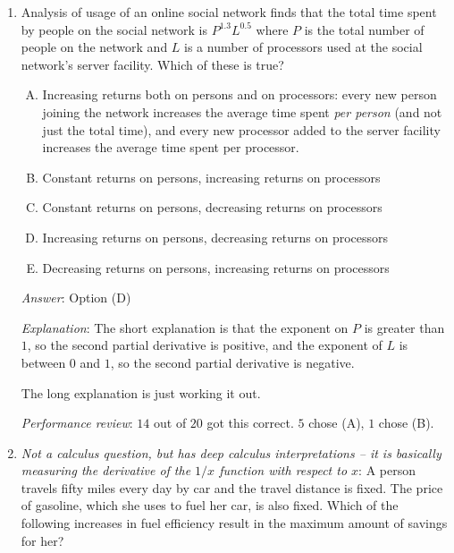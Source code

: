 \documentclass[10pt]{amsart}
\begin{document}
\begin{enumerate}
  {\em Performance review}: $12$ out of $20$ people got this
  correct. $7$ chose (A) and $1$ chose (D). The people who chose (A)
  probably didn't note that an increase in the degree of substitution
  would mean a decrease in the derivative, rather than an increasing.
\item Analysis of usage of an online social network finds that the
  total time spent by people on the social network is $P^{1.3}L^{0.5}$
  where $P$ is the total number of people on the network and $L$ is a
  number of processors used at the social network's server
  facility. Which of these is true?

  \begin{enumerate}[(A)]
  \item Increasing returns both on persons and on processors: every
    new person joining the network increases the average time spent
    {\em per person} (and not just the total time), and every new
    processor added to the server facility increases the average time
    spent per processor.
  \item Constant returns on persons, increasing returns on processors
  \item Constant returns on persons, decreasing returns on processors
  \item Increasing returns on persons, decreasing returns on processors
  \item Decreasing returns on persons, increasing returns on processors
  \end{enumerate}

  {\em Answer}: Option (D)

  {\em Explanation}: The short explanation is that the exponent on $P$
  is greater than $1$, so the second partial derivative is positive,
  and the exponent of $L$ is between $0$ and $1$, so the second
  partial derivative is negative.

  The long explanation is just working it out.

  {\em Performance review}: $14$ out of $20$ got this correct. $5$
  chose (A), $1$ chose (B).

\item {\em Not a calculus question, but has deep calculus
  interpretations -- it is basically measuring the derivative of the
  $1/x$ function with respect to $x$}: A person travels fifty miles
  every day by car and the travel distance is fixed. The price of
  gasoline, which she uses to fuel her car, is also fixed. Which of
  the following increases in fuel efficiency result in the maximum
  amount of savings for her?


\end{enumerate}
\end{document}
